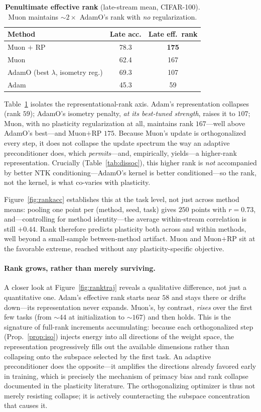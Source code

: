 \documentclass[letterpaper]{article} %
\begin{document}
\begin{table}[t]\centering\small
\caption{\textbf{Penultimate effective rank} (late-stream mean, CIFAR-100). Muon maintains ${\sim}2{\times}$ AdamO's rank with \emph{no} regularization.}
\label{tab:rank}
\begin{tabular}{lcc}
\toprule
Method & Late acc. & Late eff.\ rank \\
\midrule
Muon $+$ RP & 78.3 & \textbf{175} \\
Muon & 62.4 & 167 \\
AdamO (best $\lambda$, isometry reg.) & 69.3 & 107 \\
Adam & 45.3 & 59 \\
\bottomrule
\end{tabular}
\end{table}
Table~\ref{tab:rank} isolates the representational-rank axis. Adam's representation collapses (rank $59$); AdamO's isometry penalty, \emph{at its best-tuned strength}, raises it to $107$; Muon, with no plasticity regularization at all, maintains rank $167$---well above AdamO's best---and Muon$+$RP $175$. Because Muon's update is orthogonalized every step, it does not collapse the update spectrum the way an adaptive preconditioner does, which \emph{permits}---and, empirically, yields---a higher-rank representation. Crucially (Table~\ref{tab:dissoc}), this higher rank is \emph{not} accompanied by better NTK conditioning---AdamO's kernel is better conditioned---so the rank, not the kernel, is what co-varies with plasticity.

Figure~\ref{fig:rankacc} establishes this at the task level, not just across method means: pooling one point per (method, seed, task) gives $250$ points with $r{=}0.73$, and---controlling for method identity---the average within-stream correlation is still $+0.44$. Rank therefore predicts plasticity both across and within methods, well beyond a small-sample between-method artifact. Muon and Muon$+$RP sit at the favorable extreme, reached without any plasticity-specific objective.

\paragraph{Rank grows, rather than merely surviving.} A closer look at Figure~\ref{fig:ranktraj} reveals a qualitative difference, not just a quantitative one. Adam's effective rank starts near $58$ and stays there or drifts down---its representation never expands. Muon's, by contrast, \emph{rises} over the first few tasks (from ${\sim}44$ at initialization to ${\sim}167$) and then holds. This is the signature of full-rank increments accumulating: because each orthogonalized step (Prop.~\ref{prop:iso}) injects energy into all directions of the weight space, the representation progressively fills out the available dimensions rather than collapsing onto the subspace selected by the first task. An adaptive preconditioner does the opposite---it amplifies the directions already favored early in training, which is precisely the mechanism of primacy bias and rank collapse documented in the plasticity literature. The orthogonalizing optimizer is thus not merely resisting collapse; it is actively counteracting the subspace concentration that causes it.
\end{document}
